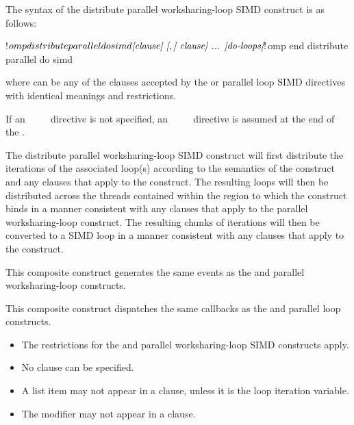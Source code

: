 \begin{fortranspecific}
The syntax of the distribute parallel worksharing-loop SIMD construct is as follows:

\begin{ompfPragma}
!$omp distribute parallel do simd \plc{[clause[ [},\plc{] clause] ... ]}
    \plc{do-loops}
\plc{[}!$omp end distribute parallel do simd\plc{]}
\end{ompfPragma}

where  can be any of the clauses accepted by the  or parallel loop
SIMD directives with identical meanings and restrictions.

If an ~~~~ directive is not specified, an
~~~~ directive is assumed at the end of the .
\end{fortranspecific}

\descr
The distribute parallel worksharing-loop SIMD construct will first distribute the iterations of the
associated loop(s) according to the semantics of the  construct and any
clauses that apply to the  construct. The resulting loops will then be
distributed across the threads contained within the  region to which the
 construct binds in a manner consistent with any clauses that apply to the
parallel worksharing-loop construct. The resulting chunks of iterations will then be converted to a
SIMD loop in a manner consistent with any clauses that apply to the  construct.

\events

This composite construct generates the same events as the  and parallel worksharing-loop constructs.

\tools

This composite construct dispatches the same callbacks as the  and parallel loop constructs.

\restrictions
\begin{itemize}
\item The restrictions for the  and parallel worksharing-loop SIMD constructs apply.
\item No  clause can be specified.
\item A list item may not appear in a  clause, unless it is the loop iteration variable.
\item The  modifier may not appear in a  clause.
\end{itemize}

